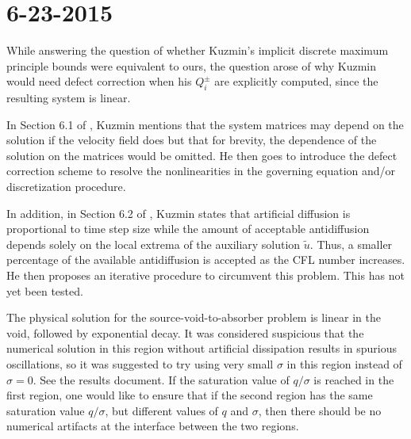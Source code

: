 \section*{6-23-2015}

\begin{enumerate}
While answering the question of whether Kuzmin's implicit discrete maximum
principle bounds were equivalent to ours, the question arose of why Kuzmin
would need defect correction when his $Q_i^\pm$ are explicitly computed,
since the resulting system is linear.

In Section 6.1 of \cite{kuzmin_FCT}, Kuzmin mentions that the system
matrices may depend on the solution if the velocity field does
but that for brevity, the dependence of the solution on the
matrices would be omitted. He then goes to introduce the defect correction
scheme to resolve the nonlinearities in the governing equation and/or
discretization procedure.

In addition, in Section 6.2 of \cite{kuzmin_FCT}, Kuzmin states
that artificial diffusion is proportional to time step size while
the amount of acceptable antidiffusion depends solely on the
local extrema of the auxiliary solution $\tilde{u}$. Thus, a
smaller percentage of the available antidiffusion is accepted
as the CFL number increases. He then proposes an iterative
procedure to circumvent this problem. This has not yet been tested.

The physical solution for the source-void-to-absorber problem is linear
in the void, followed by exponential decay. It was considered
suspicious that the numerical solution in this region without 
artificial dissipation results in spurious oscillations, so
it was suggested to try using very small $\sigma$ in this
region instead of $\sigma=0$.
See the results document.
If the saturation value of $q/\sigma$ is reached in the first
region, one would like to ensure that if the second region has
the same saturation value $q/\sigma$, but different values of
$q$ and $\sigma$, then there should be no numerical artifacts at
the interface between the two regions.
\end{enumerate}
